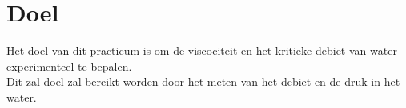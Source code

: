 \section{Doel}

Het doel van dit practicum is om de viscociteit en het
kritieke debiet van water experimenteel te bepalen.
\\
Dit zal doel zal bereikt worden door het meten van het debiet
en de druk in het water.